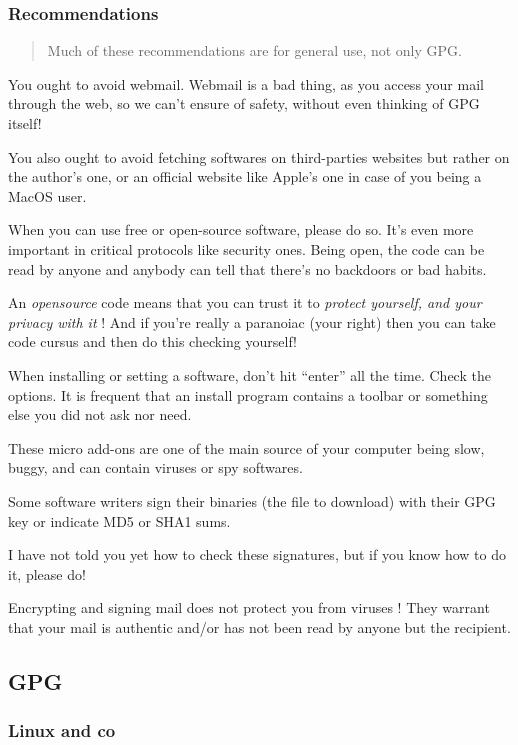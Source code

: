 \subsubsection{Recommendations}\label{recommendations}

\begin{quote}
Much of these recommendations are for general use, not only GPG.
\end{quote}

You ought to avoid webmail. Webmail is a bad thing, as you access your
mail through the web, so we can't ensure of safety, without even
thinking of GPG itself!

You also ought to avoid fetching softwares on third-parties websites but
rather on the author's one, or an official website like Apple's one in
case of you being a MacOS user.

When you can use free or open-source software, please do so. It's even
more important in critical protocols like security ones. Being open, the
code can be read by anyone and anybody can tell that there's no
backdoors or bad habits.

An \emph{opensource} code means that you can trust it to \emph{protect
yourself, and your privacy with it} ! And if you're really a paranoiac
(your right) then you can take code cursus and then do this checking
yourself!

When installing or setting a software, don't hit ``enter'' all the time.
Check the options. It is frequent that an install program contains a
toolbar or something else you did not ask nor need.

These micro add-ons are one of the main source of your computer being
slow, buggy, and can contain viruses or spy softwares.

Some software writers sign their binaries (the file to download) with
their GPG key or indicate MD5 or SHA1 sums.

I have not told you yet how to check these signatures, but if you know
how to do it, please do!

Encrypting and signing mail does not protect you from viruses ! They
warrant that your mail is authentic and/or has not been read by anyone
but the recipient.

\subsection{GPG}\label{gpg}

\subsubsection{Linux and co}\label{linux-and-co}

